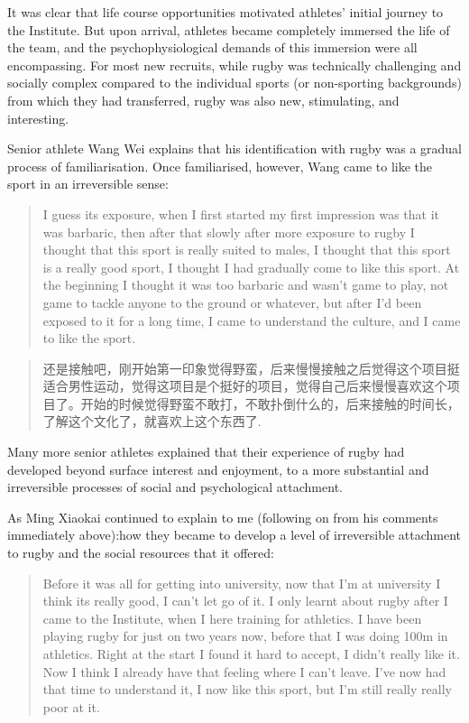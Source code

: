\begin{CJK}{UTF8}{gbsn}
It was clear that life course opportunities motivated athletes' initial journey to the Institute.  But upon arrival, athletes became completely immersed the life of the team, and the psychophysiological demands of this immersion were all encompassing.  For most new recruits, while rugby was technically challenging and socially complex compared to the individual sports (or non-sporting backgrounds) from which they had transferred, rugby was also new, stimulating, and interesting.

Senior athlete Wang Wei explains that his identification with rugby was a gradual process of familiarisation. Once familiarised, however, Wang came to like the sport in an irreversible sense:
             \begin{quote}
               I guess its exposure, when I first started my first impression was that it was barbaric, then after that slowly after more exposure to rugby I thought that this sport is really suited to males, I thought that this sport is a really good sport, I thought I had gradually come to like this sport.  At the beginning I thought it was too barbaric and wasn’t game to play, not game to tackle anyone to the ground or whatever, but after I’d been exposed to it for a long time, I came to understand the culture, and I came to like the sport.
           \end{quote}

             \begin{quote}
               还是接触吧，刚开始第一印象觉得野蛮，后来慢慢接触之后觉得这个项目挺适合男性运动，觉得这项目是个挺好的项目，觉得自己后来慢慢喜欢这个项目了。开始的时候觉得野蛮不敢打，不敢扑倒什么的，后来接触的时间长，了解这个文化了，就喜欢上这个东西了.
             \end{quote}

    Many more senior athletes explained that their experience of rugby had developed beyond surface interest and enjoyment, to a more substantial and irreversible processes of social and psychological attachment.

    As Ming Xiaokai continued to explain to me (following on from his comments immediately above):how they became to develop a level of irreversible attachment to rugby and the social resources that it offered:

           \begin{quote}
               Before it was all for getting into university, now that I'm at university I think its really good, I can't let go of it.
               I only learnt about rugby after I came to the Institute, when I here training for athletics.  I have been playing rugby for just on two years now, before that I was doing 100m in athletics.  Right at the start I found it hard to accept, I didn’t really like it. Now I think I already have that feeling where I can’t leave.  I’ve now had that time to understand it, I now like this sport, but I’m still really really poor at it.
           \end{quote}


\end{CJK}

